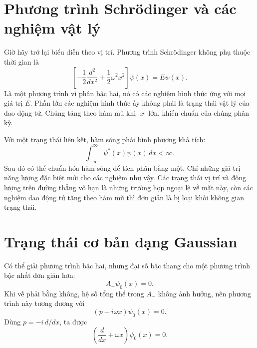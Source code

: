 \begin{classroomqa}
\end{classroomqa}

\section{Phương trình Schr\"odinger và các nghiệm vật lý}

Giờ hãy trở lại biểu diễn theo vị trí. Phương trình Schr\"odinger không phụ thuộc thời gian là
\begin{equation}
\left[
-\frac12\frac{d^{2}}{dx^{2}}
+\frac12\omega^{2}x^{2}
\right]\psi(x)=E\psi(x).
\end{equation}
Là một phương trình vi phân bậc hai, nó có các nghiệm hình thức ứng với mọi giá trị \(E\). Phần lớn các nghiệm hình thức ấy không phải là trạng thái vật lý của dao động tử. Chúng tăng theo hàm mũ khi \(\lvert x\rvert\) lớn, khiến chuẩn của chúng phân kỳ.

Với một trạng thái liên kết, hàm sóng phải bình phương khả tích:
\begin{equation}
\int_{-\infty}^{\infty}\psi^{*}(x)\psi(x)\,dx<\infty.
\end{equation}
Sau đó có thể chuẩn hóa hàm sóng để tích phân bằng một. Chỉ những giá trị năng lượng đặc biệt mới cho các nghiệm như vậy. Các trạng thái vị trí và động lượng trên đường thẳng vô hạn là những trường hợp ngoại lệ về mặt này, còn các nghiệm dao động tử tăng theo hàm mũ thì đơn giản là bị loại khỏi không gian trạng thái.

\section{Trạng thái cơ bản dạng Gaussian}

Có thể giải phương trình bậc hai, nhưng đại số bậc thang cho một phương trình bậc nhất đơn giản hơn:
\begin{equation}
A_{-}\psi_{0}(x)=0.
\end{equation}
Khi vế phải bằng không, hệ số tổng thể trong \(A_{-}\) không ảnh hưởng, nên phương trình này tương đương với
\begin{equation}
(p-i\omega x)\psi_{0}(x)=0.
\end{equation}
Dùng \(p=-i\,d/dx\), ta được
\begin{equation}
\left(\frac{d}{dx}+\omega x\right)\psi_{0}(x)=0.
\end{equation}

